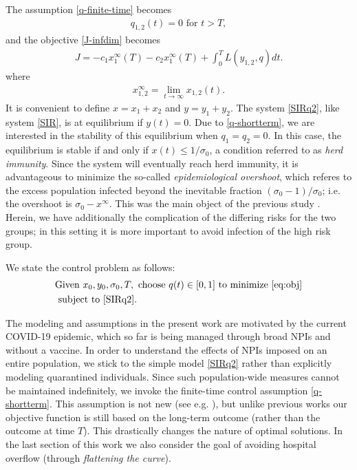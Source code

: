 \documentclass[english,12pt,letter]{article}
\newcommand{\Rnot}{\sigma_0}
\newcommand{\xinf}{x^\infty}
\newcommand{\xoneinf}{x_1^\infty}
\newcommand{\xtwoinf}{x_1^\infty}
\begin{document}
The assumption \eqref{q-finite-time} becomes
\begin{align} \label{q-shortterm}
    q_{1,2}(t)=0 \text{ for } t>T,
\end{align}
and the objective \eqref{J-infdim} becomes
\begin{align} \label{eq:obj}
    J = -c_1 \xoneinf(T) - c_2 \xtwoinf(T) + \int_0^T L(y_{1,2},q)dt.
\end{align}
where
\begin{align}
    x_{1,2}^\infty = \lim_{t\to\infty} x_{1,2}(t).
\end{align}
It is convenient to define $x=x_1+x_2$ and $y=y_1+y_2$.
The system \eqref{SIRq2}, like system \eqref{SIR}, is at equilibrium if
$y(t)=0$.  Due to \eqref{q-shortterm}, we are interested in the stability
of this equilibrium when $q_1=q_2=0$.
In this case, the equilibrium is stable if and
only if $x(t)\le 1/\Rnot$, a condition referred to as {\em herd immunity}.
Since the system will eventually reach herd immunity, it is advantageous
to minimize the so-called {\em epidemiological overshoot}, which referes
to the excess population infected beyond the inevitable fraction $(\Rnot-1)/\Rnot$;
i.e. the overshoot is $\Rnot-\xinf$.
This was the main object of the previous study \cite{ketcheson2020}.
Herein, we have additionally the complication of the differing risks for the
two groups; in this setting it is more important to avoid infection of
the high risk group.

We state the control problem as follows:
\begin{align} \label{eq:basic-problem}
\begin{aligned}
& \text{Given } x_0, y_0, \sigma_0, T, \text{ choose } q(t) \in [0,1] \text{ to minimize \eqref{eq:obj}}  \\
& \text{ subject to } \eqref{SIRq2}.
\end{aligned}
\end{align}

The modeling and assumptions in the present work are motivated by the
current COVID-19 epidemic, which so far is being managed through broad
NPIs and without a vaccine.  In order to understand the effects of NPIs
imposed on an entire population, we stick to the simple model \eqref{SIRq2}
rather than explicitly modeling quarantined individuals.
Since such population-wide measures cannot be maintained indefinitely, we
invoke the finite-time control assumption \eqref{q-shortterm}.
This assumption is not new (see e.g. \cite{greenhalgh1988some}),
but unlike previous works our objective function is still based on the
long-term outcome (rather than the outcome at time $T$).
This drastically changes the nature of optimal solutions.
In the last section of this work we also consider the goal of avoiding
hospital overflow (through {\em flattening the curve}).
\end{document}
